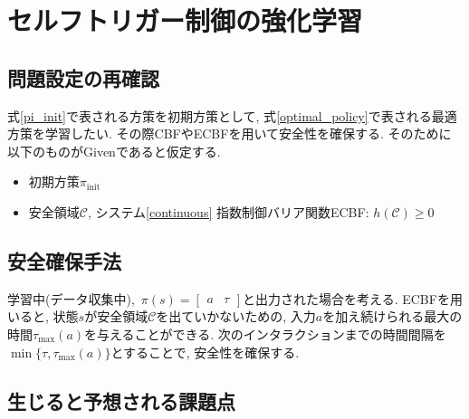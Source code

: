 \documentclass{jsarticle}
\begin{document}
\section{セルフトリガー制御の強化学習}

\subsection{問題設定の再確認}
式\eqref{pi_init}で表される方策を初期方策として, 式\eqref{optimal_policy}で表される最適方策を学習したい. その際CBFやECBFを用いて安全性を確保する. そのために以下のものがGivenであると仮定する.
\begin{itemize}
\item 初期方策$\pi_{\textrm{init}}$ %
\item 安全領域$\mathcal{C}$, システム\eqref{continuous} 指数制御バリア関数ECBF: $h(\mathcal{C})\geq0$
\end{itemize}

\subsection{安全確保手法}
学習中(データ収集中),~$\pi(s)=\begin{bmatrix}a & \tau\end{bmatrix}$と出力された場合を考える. ECBFを用いると, 状態$s$が安全領域$\mathcal{C}$を出ていかないための, 入力$a$を加え続けられる最大の時間$\tau_{\textrm{max}}(a)$を与えることができる. 次のインタラクションまでの時間間隔を$\min\{\tau, \tau_{\textrm{max}}(a)\}$とすることで, 安全性を確保する.

\subsection{生じると予想される課題点}
\end{document}
